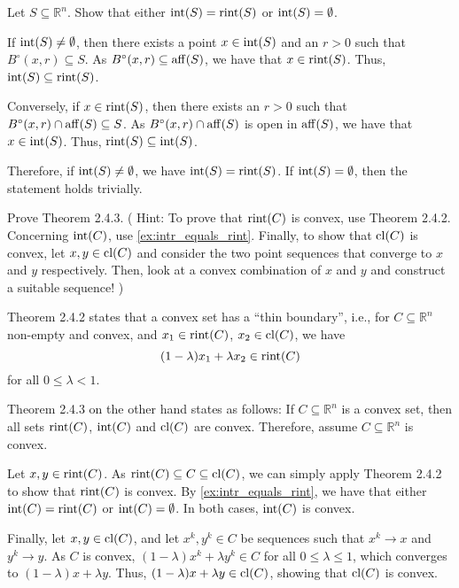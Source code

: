 
\begin{exercise}\label{ex:intr_equals_rint}
  Let $S \subseteq \mathbb{R}^n$.
  Show that either $\operatorname*{int}(S) = \operatorname*{rint}(S)$ or $\operatorname*{int}(S) = \emptyset$.
\end{exercise}

\begin{solution}
  If $\operatorname*{int}(S) \neq \emptyset$, then there exists a point $x \in \operatorname*{int}(S)$ and an $r > 0$ such that $B^\circ(x, r) \subseteq S$.
  As $B^\circ(x, r) \subseteq \operatorname*{aff}(S)$, we have that $x \in \operatorname*{rint}(S)$.
  Thus, $\operatorname*{int}(S) \subseteq \operatorname*{rint}(S)$.

  Conversely, if $x \in \operatorname*{rint}(S)$, then there exists an $r > 0$ such that $B^\circ(x, r) \cap \operatorname*{aff}(S) \subseteq S$.
  As $B^\circ(x, r) \cap \operatorname*{aff}(S)$ is open in $\operatorname*{aff}(S)$, we have that $x \in \operatorname*{int}(S)$.
  Thus, $\operatorname*{rint}(S) \subseteq \operatorname*{int}(S)$.

  Therefore, if $\operatorname*{int}(S) \neq \emptyset$, we have $\operatorname*{int}(S) = \operatorname*{rint}(S)$.
  If $\operatorname*{int}(S) = \emptyset$, then the statement holds trivially.
\end{solution}

\begin{exercise}
  Prove Theorem 2.4.3.
  (%
    Hint: To prove that $\operatorname*{rint}(C)$ is convex, use Theorem 2.4.2.
    Concerning $\operatorname*{int}(C)$, use \cref{ex:intr_equals_rint}.
    Finally, to show that $\operatorname*{cl}(C)$ is convex, let $x, y \in \operatorname*{cl}(C)$ and consider the two point sequences that converge to $x$ and $y$ respectively.
    Then, look at a convex combination of $x$ and $y$ and construct a suitable sequence!%
  )
\end{exercise}

\begin{solution}
  Theorem 2.4.2 states that a convex set has a ``thin boundary'', i.e., for $C \subseteq \mathbb{R}^n$ non-empty and convex, and $x_1 \in \operatorname*{rint}(C)$, $x_2 \in \operatorname*{cl}(C)$, we have
  \begin{equation}
    (1 - \lambda) x_1 + \lambda x_2 \in \operatorname*{rint}(C)
  \end{equation}
  for all $0 \leq \lambda < 1$.

  Theorem 2.4.3 on the other hand states as follows:
  If $C \subseteq \mathbb{R}^n$ is a convex set, then all sets $\operatorname*{rint}(C)$, $\operatorname*{int}(C)$ and $\operatorname*{cl}(C)$ are convex.
  Therefore, assume $C \subseteq \mathbb{R}^n$ is convex.

  Let $x, y \in \operatorname*{rint}(C)$.
  As $\operatorname*{rint}(C) \subseteq C \subseteq \operatorname*{cl}(C)$, we can simply apply Theorem 2.4.2 to show that $\operatorname*{rint}(C)$ is convex.
  By \cref{ex:intr_equals_rint}, we have that either $\operatorname*{int}(C) = \operatorname*{rint}(C)$ or $\operatorname*{int}(C) = \emptyset$.
  In both cases, $\operatorname*{int}(C)$ is convex.

  Finally, let $x, y \in \operatorname*{cl}(C)$,
  and let $x^k, y^k \in C$ be sequences such that $x^k \to x$ and $y^k \to y$.
  As $C$ is convex, $(1 - \lambda) x^k + \lambda y^k \in C$ for all $0 \leq \lambda \leq 1$, which converges to $(1 - \lambda) x + \lambda y$.
  Thus, $(1 - \lambda) x + \lambda y \in \operatorname*{cl}(C)$, showing that $\operatorname*{cl}(C)$ is convex.
\end{solution}